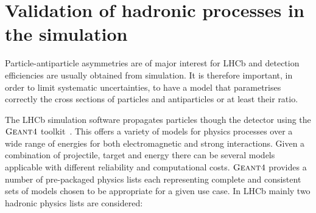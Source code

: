 \section{Validation of hadronic processes in the simulation}

Particle-antiparticle asymmetries are of major interest for LHCb and detection efficiencies are usually obtained from simulation.
It is therefore important, in order to limit systematic uncertainties, to have a model that parametrises
correctly the cross sections of particles and antiparticles or at least their ratio.

The LHCb simulation software propagates particles though the detector using the $\textsc{Geant4}$ toolkit~\cite{Alves:2008zz}.
This offers a variety of models for physics processes over a wide range of energies for both electromagnetic and strong interactions.
Given a combination of projectile, target and energy there can be several models applicable with different reliability
and computational costs. $\textsc{Geant4}$ provides a number of pre-packaged physics lists each representing
complete and consistent sets of models chosen to be appropriate for a given use case. In LHCb mainly two hadronic
physics lists are considered:
%
